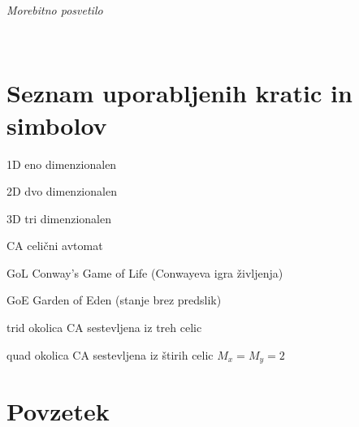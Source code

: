\documentclass[12pt,a4paper,openany,twoside]{book}
\newcommand{\abbrlabel}[1]{\makebox[3cm][l]{\textbf{#1}\ \dotfill}}
\newenvironment{abbreviations}{\begin{list}{}{\renewcommand{\makelabel}{\abbrlabel}}}{\end{list}}
\begin{document}
$\;$ 

\vspace{5cm}
\hfill {\Large \em Morebitno posvetilo}
\thispagestyle{empty}

\newpage



\ \thispagestyle{empty}

\newpage


\renewcommand\thepage{} 
\tableofcontents 
\renewcommand\thepage{\arabic{page}}

\thispagestyle{empty}



\chapter*{Seznam uporabljenih kratic in simbolov}

\thispagestyle{empty}


\begin{abbreviations}
\item[1D] eno dimenzionalen
\item[2D] dvo dimenzionalen
\item[3D] tri dimenzionalen
\item[CA] celični avtomat
\item[GoL] Conway's Game of Life (Conwayeva igra življenja)
\item[GoE] Garden of Eden (stanje brez predslik)
\item[trid] okolica CA sestevljena iz treh celic
\item[quad] okolica CA sestevljena iz štirih celic \(M_x=M_y=2\)
\end{abbreviations}


\clearpage{\pagestyle{empty}\cleardoublepage}


\setcounter{page}{1}

\chapter*{Povzetek}
\end{document}
